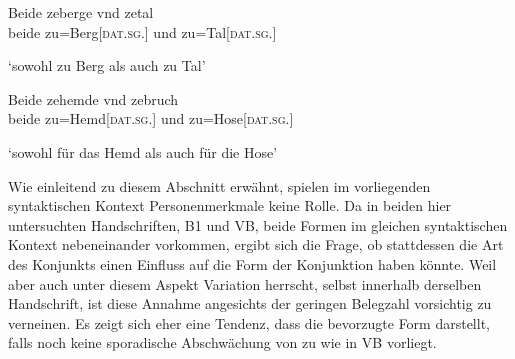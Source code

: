 \begin{exe}
\ex \label{ex:syntintvar2}
\begin{xlist}
	\ex \label{ex:syntintvar2_1}
		\begin{taggedline}{\parencites[\pno~21rc,30]{kc:B1}[zu][\pno~7572--7583]{schroeder1895}}
		\end{taggedline}

	\ex \label{ex:syntintvar2_3}
		\begin{taggedline}{\parencites[\pno~36vb,13]{kc:VB}[zu][\pno~7572--7583]{schroeder1895}}
		\end{taggedline}
\end{xlist}

\ex \label{ex:syntintvar5}
\begin{xlist}
	\ex \label{ex:syntintvar2_2}
		\begin{taggedline}{\parencites[\pno~32rb,35]{kc:B1}[zu][11610\psqq]{schroeder1895}}
		\end{taggedline}

	\ex \label{ex:syntintvar2_4}
		\gll Beide zeberge vnd zetal \\
			beide zu=Berg[\textsc{dat.sg.\MascI}] und zu=Tal[\textsc{dat.sg.\NeutI}] \\
		\begin{taggedline}{\parencites[\pno~83vb,3]{kc:VB}[zu][11610\psqq]{schroeder1895}}
		\trans `sowohl zu Berg als auch zu Tal'
		\end{taggedline}
\end{xlist}

\ex \label{ex:syntintvar4}
	\gll Beide zehemde vnd zebruch \\
		beide zu=Hemd[\textsc{dat.sg.\NeutI}] und zu=Hose[\textsc{dat.sg.\FemI}] \\
	\begin{taggedline}{\parencites[\pno~99rb,21]{kc:VB}[vgl.~abweichend][\pno~14799]{schroeder1895}}
	\trans `sowohl für das Hemd als auch für die Hose'
	\end{taggedline}
\end{exe}

Wie einleitend zu diesem Abschnitt erwähnt, spielen im vorliegenden
syntaktischen Kontext Personenmerkmale keine Rolle. Da in beiden hier
untersuchten Handschriften, B1 und VB, beide Formen im
gleichen syntaktischen Kontext nebeneinander vorkommen, ergibt sich die Frage,
ob stattdessen die Art des Konjunkts einen Einfluss auf die Form der
Konjunktion haben könnte. Weil aber auch unter diesem Aspekt Variation
herrscht, selbst innerhalb derselben Handschrift, ist diese Annahme angesichts
der geringen Belegzahl vorsichtig zu verneinen. Es zeigt sich eher eine
Tendenz, dass  die bevorzugte Form darstellt, falls noch keine
sporadische Abschwächung von  zu  wie in VB
vorliegt.

